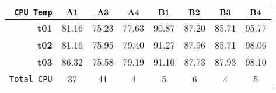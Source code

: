 \begin{tabular}{r|ccccccc}\cline{2-8}
\tt CPU Temp&$\bf A1$&$\bf A3$&$\bf A4$&$\bf B1$&$\bf B2$&$\bf B3$&$\bf B4$\\\hline
\bf t01& 81.16& 75.23& 77.63& 90.87& 87.20& 85.71& 95.77\\
\bf t02& 81.16& 75.95& 79.40& 91.27& 87.96& 85.71& 98.06\\
\bf t03& 86.32& 75.58& 79.19& 91.10& 87.73& 87.93& 98.10\\
\hline
\tt Total CPU& 37& 41& 4& 5& 6& 4& 5\\
\end{tabular}
